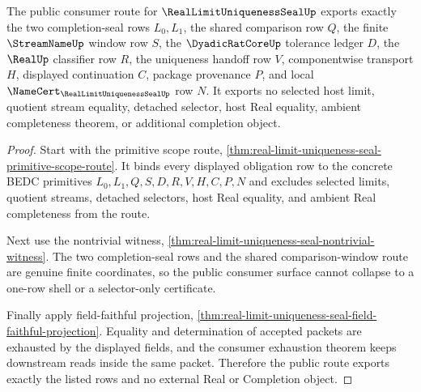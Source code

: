 \begin{theorem}
\label{thm:real-limit-uniqueness-seal-public-route-surface}
The public consumer route for $\RealLimitUniquenessSealUp$ exports exactly the two completion-seal rows $L_0,L_1$, the shared comparison row $Q$, the finite $\StreamNameUp$ window row $S$, the $\DyadicRatCoreUp$ tolerance ledger $D$, the $\RealUp$ classifier row $R$, the uniqueness handoff row $V$, componentwise transport $H$, displayed continuation $C$, package provenance $P$, and local $\NameCert_{\RealLimitUniquenessSealUp}$ row $N$. It exports no selected host limit, quotient stream equality, detached selector, host Real equality, ambient completeness theorem, or additional completion object.
\end{theorem}
\begin{proof}
Start with the primitive scope route, \autoref{thm:real-limit-uniqueness-seal-primitive-scope-route}. It binds every displayed obligation row to the concrete BEDC primitives $L_0,L_1,Q,S,D,R,V,H,C,P,N$ and excludes selected limits, quotient streams, detached selectors, host Real equality, and ambient Real completeness from the route.

Next use the nontrivial witness, \autoref{thm:real-limit-uniqueness-seal-nontrivial-witness}. The two completion-seal rows and the shared comparison-window route are genuine finite coordinates, so the public consumer surface cannot collapse to a one-row shell or a selector-only certificate.

Finally apply field-faithful projection, \autoref{thm:real-limit-uniqueness-seal-field-faithful-projection}. Equality and determination of accepted packets are exhausted by the displayed fields, and the consumer exhaustion theorem keeps downstream reads inside the same packet. Therefore the public route exports exactly the listed rows and no external Real or Completion object.
\end{proof}

